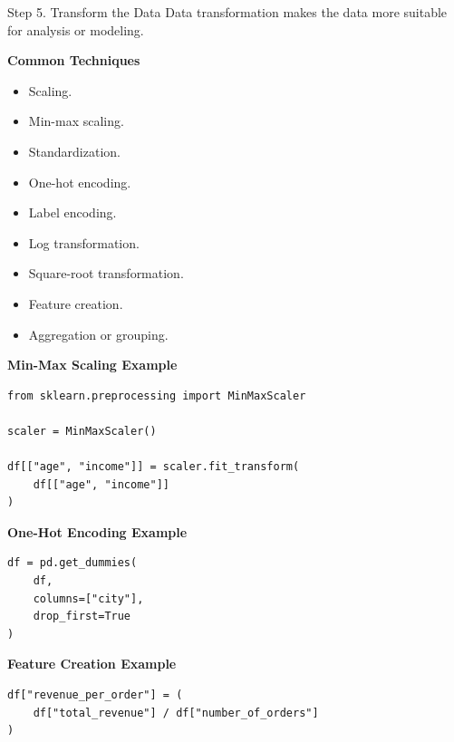 \documentclass[aspectratio=169,11pt]{beamer}
\begin{document}
\begin{frame}{Step 5. Transform the Data}
\footnotesize
Data transformation makes the data more suitable for analysis or modeling.\par\medskip
\textbf{Common Techniques}\par\medskip
\begin{itemize}
\item Scaling.
\item Min-max scaling.
\item Standardization.
\item One-hot encoding.
\item Label encoding.
\item Log transformation.
\item Square-root transformation.
\item Feature creation.
\item Aggregation or grouping.
\end{itemize}
\textbf{Min-Max Scaling Example}\par\medskip
\begin{lstlisting}[style=py]
from sklearn.preprocessing import MinMaxScaler

scaler = MinMaxScaler()

df[["age", "income"]] = scaler.fit_transform(
    df[["age", "income"]]
)
\end{lstlisting}
\textbf{One-Hot Encoding Example}\par\medskip
\begin{lstlisting}[style=py]
df = pd.get_dummies(
    df,
    columns=["city"],
    drop_first=True
)
\end{lstlisting}
\textbf{Feature Creation Example}\par\medskip
\begin{lstlisting}[style=py]
df["revenue_per_order"] = (
    df["total_revenue"] / df["number_of_orders"]
)
\end{lstlisting}
\end{frame}
\end{document}
